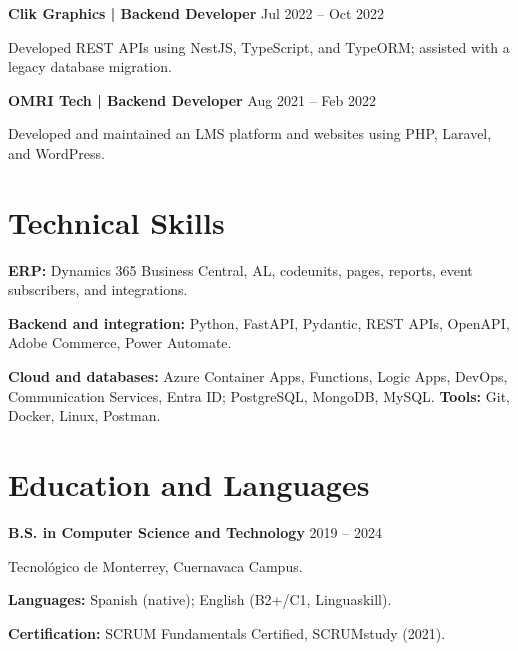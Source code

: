 \documentclass[10pt,letterpaper]{article}
\begin{document}
\vspace{3pt}
\textbf{Clik Graphics | Backend Developer} \hfill Jul 2022 -- Oct 2022\par
Developed REST APIs using NestJS, TypeScript, and TypeORM; assisted with a legacy database migration.

\vspace{3pt}
\textbf{OMRI Tech | Backend Developer} \hfill Aug 2021 -- Feb 2022\par
Developed and maintained an LMS platform and websites using PHP, Laravel, and WordPress.

\section{Technical Skills}
\textbf{ERP:} Dynamics 365 Business Central, AL, codeunits, pages, reports, event subscribers, and integrations.\par
\textbf{Backend and integration:} Python, FastAPI, Pydantic, REST APIs, OpenAPI, Adobe Commerce, Power Automate.\par
\textbf{Cloud and databases:} Azure Container Apps, Functions, Logic Apps, DevOps, Communication Services, Entra ID; PostgreSQL, MongoDB, MySQL. \textbf{Tools:} Git, Docker, Linux, Postman.

\section{Education and Languages}
\textbf{B.S. in Computer Science and Technology} \hfill 2019 -- 2024\par
Tecnológico de Monterrey, Cuernavaca Campus.\par
\textbf{Languages:} Spanish (native); English (B2+/C1, Linguaskill).\par
\textbf{Certification:} SCRUM Fundamentals Certified, SCRUMstudy (2021).
\end{document}
